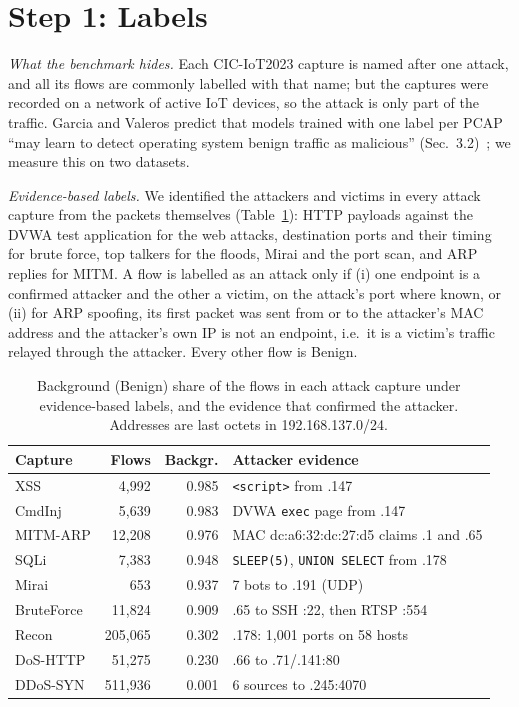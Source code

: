 \section{Step 1: Labels}\label{sec:labels}

\emph{What the benchmark hides.} Each CIC-IoT2023 capture is named after one attack, and all its flows are commonly labelled with that name; but the captures were recorded on a network of active IoT devices, so the attack is only part of the traffic. Garcia and Valeros predict that models trained with one label per PCAP ``may learn to detect operating system benign traffic as malicious'' (Sec.~3.2)~\cite{garcia2023labeling}; we measure this on two datasets.

\emph{Evidence-based labels.} We identified the attackers and victims in every attack capture from the packets themselves (Table~\ref{tab:background}): HTTP payloads against the DVWA test application for the web attacks, destination ports and their timing for brute force, top talkers for the floods, Mirai and the port scan, and ARP replies for MITM. A flow is labelled as an attack only if (i) one endpoint is a confirmed attacker and the other a victim, on the attack's port where known, or (ii) for ARP spoofing, its first packet was sent from or to the attacker's MAC address and the attacker's own IP is not an endpoint, i.e.\ it is a victim's traffic relayed through the attacker. Every other flow is Benign.

\begin{table}[t]
\centering
\caption{Background (Benign) share of the flows in each attack capture under evidence-based labels, and the evidence that confirmed the attacker. Addresses are last octets in 192.168.137.0/24.}
\label{tab:background}
\footnotesize
\setlength{\tabcolsep}{3pt}
\begin{tabular}{lrrp{3.6cm}}
\hline
Capture & Flows & Backgr. & Attacker evidence \\
\hline
XSS          &   4,992 & 0.985 & \texttt{<script>} from .147 \\
CmdInj       &   5,639 & 0.983 & DVWA \texttt{exec} page from .147 \\
MITM-ARP     &  12,208 & 0.976 & MAC dc:a6:32:dc:27:d5 claims .1 and .65 \\
SQLi         &   7,383 & 0.948 & \texttt{SLEEP(5)}, \texttt{UNION SELECT} from .178 \\
Mirai        &     653 & 0.937 & 7 bots to .191 (UDP) \\
BruteForce   &  11,824 & 0.909 & .65 to SSH :22, then RTSP :554 \\
Recon        & 205,065 & 0.302 & .178: 1,001 ports on 58 hosts \\
DoS-HTTP     &  51,275 & 0.230 & .66 to .71/.141:80 \\
DDoS-SYN     & 511,936 & 0.001 & 6 sources to .245:4070 \\
\hline
\end{tabular}
\end{table}

